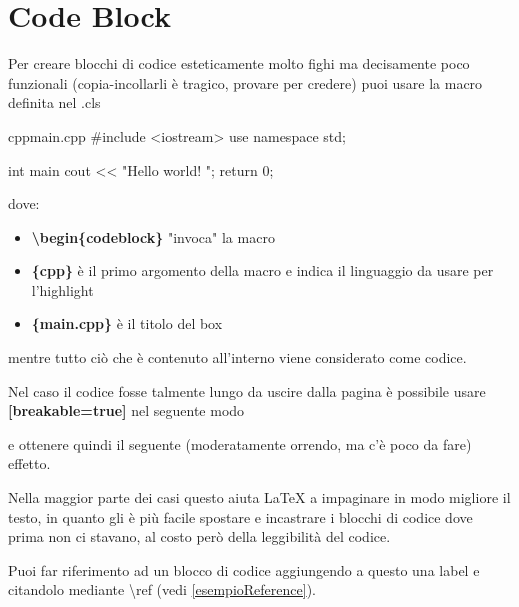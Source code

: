 \chapter{Code Block}

Per creare blocchi di codice esteticamente molto fighi ma decisamente poco funzionali (copia-incollarli è tragico, provare per credere) puoi usare la macro definita nel .cls 

\begin{codeblock}[label=esempioReference]{cpp}{main.cpp}
#include <iostream>
use namespace std;

int main{
    cout << "Hello world! \n";
    return 0;
}
\end{codeblock}

dove:
\begin{itemize}
    \item \textbf{\textbackslash begin\{codeblock\}} "invoca" la macro
    \item \textbf{\{cpp\}} è il primo argomento della macro e indica il linguaggio da usare per l'highlight
    \item \textbf{\{main.cpp\}} è il titolo del box
\end{itemize}

mentre tutto ciò che è contenuto all'interno viene considerato come codice.

Nel caso il codice fosse talmente lungo da uscire dalla pagina è possibile usare \textbf{[breakable=true]} nel seguente modo



e ottenere quindi il seguente (moderatamente orrendo, ma c'è poco da fare) effetto.

Nella maggior parte dei casi questo aiuta LaTeX a impaginare in modo migliore il testo, in quanto gli è più facile spostare e incastrare i blocchi di codice dove prima non ci stavano, al costo però della leggibilità del codice.

Puoi far riferimento ad un blocco di codice aggiungendo a questo una label e citandolo mediante \textbackslash{}ref (vedi \ref{esempioReference}).